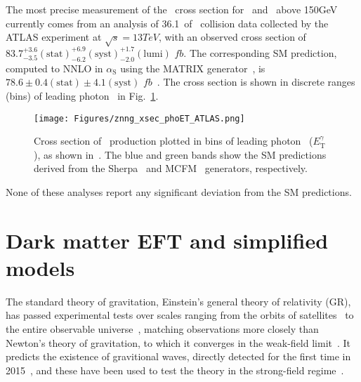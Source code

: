 The most precise measurement of the \zinvg\ cross section for \pTgamma\ and \MET\ above 150\unit{GeV} currently comes from an analysis of 36.1\fbinv\ of \Pp\Pp\ collision data
collected by the ATLAS experiment at $\sqrt{s} = 13\unit{TeV}$, with an observed cross section of $83.7^{+3.6}_{-3.5}\mathrm{(stat)}^{+6.9}_{-6.2}\mathrm{(syst)}^{+1.7}_{-2.0}\mathrm{(lumi)}$ $fb$.
The corresponding SM prediction, computed to NNLO in $\alpha_\mathrm{S}$ using the MATRIX generator~\cite{ref:epjc/s10052-018-5771-7}, is $78.6 \pm 0.4\mathrm{(stat)} \pm 4.1\mathrm{(syst)}$ $fb$~\cite{ref:CERN-EP-2018-220}.
The cross section is shown in discrete ranges (bins) of leading photon \pT\ in Fig.~\ref{fig:znng_xsec_phoET_ATLAS}.

\begin{figure}[hbtp]
  \begin{center}
    \texttt{[image: Figures/znng\_xsec\_phoET\_ATLAS.png]}
    \caption{
      Cross section of \zinvg\ production plotted in bins of leading photon \pT\ ($E^{\gamma}_\mathrm{T}$), as shown in~\cite{ref:CERN-EP-2018-220}.
      The blue and green bands show the SM predictions derived from the Sherpa~\cite{ref:1126-6708/2009/02/007} and MCFM~\cite{ref:JHEP07(2011)018} generators, respectively.
    }
    \label{fig:znng_xsec_phoET_ATLAS}
  \end{center}
\end{figure}

None of these analyses report any significant deviation from the SM predictions.

\section{Dark matter EFT and simplified models} \label{sec:introduction_dm}
The standard theory of gravitation, Einstein's
general theory of relativity (GR), has passed experimental tests over scales ranging from the orbits of satellites~\cite{ref:lrr-2003-1} to the entire observable universe~\cite{ref:planck2018_cosparams},
matching observations more closely than Newton's theory of gravitation, to which it converges in the weak-field limit~\cite{ref:WaldGR}.
It predicts the existence of gravitional waves, directly detected for the first time in 2015~\cite{ref:PhysRevLett.116.061102}, and these have been used to test the theory in the strong-field regime~\cite{ref:PhysRevLett.116.221101}.

